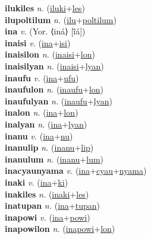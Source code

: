 \textbf{ilukiles} \textit{n.} (\hyperref[iluki]{iluki}+\hyperref[les]{les})
 \label{ilukiles} \\
\textbf{ilupoltilum} \textit{n.} (\hyperref[ilu]{ilu}+\hyperref[poltilum]{poltilum})
 \label{ilupoltilum} \\
\textbf{ina} \textit{v.} (Yor. ⟨iná⟩ [ĩ̄á])
 \label{ina} \\
\textbf{inaisi} \textit{v.} (\hyperref[ina]{ina}+\hyperref[isi]{isi})
 \label{inaisi} \\
\textbf{inaisilon} \textit{n.} (\hyperref[inaisi]{inaisi}+\hyperref[lon]{lon})
 \label{inaisilon} \\
\textbf{inaisilyan} \textit{n.} (\hyperref[inaisi]{inaisi}+\hyperref[lyan]{lyan})
 \label{inaisilyan} \\
\textbf{inaufu} \textit{v.} (\hyperref[ina]{ina}+\hyperref[ufu]{ufu})
 \label{inaufu} \\
\textbf{inaufulon} \textit{n.} (\hyperref[inaufu]{inaufu}+\hyperref[lon]{lon})
 \label{inaufulon} \\
\textbf{inaufulyan} \textit{n.} (\hyperref[inaufu]{inaufu}+\hyperref[lyan]{lyan})
 \label{inaufulyan} \\
\textbf{inalon} \textit{n.} (\hyperref[ina]{ina}+\hyperref[lon]{lon})
 \label{inalon} \\
\textbf{inalyan} \textit{n.} (\hyperref[ina]{ina}+\hyperref[lyan]{lyan})
 \label{inalyan} \\
\textbf{inanu} \textit{v.} (\hyperref[ina]{ina}+\hyperref[nu]{nu})
 \label{inanu} \\
\textbf{inanulip} \textit{n.} (\hyperref[inanu]{inanu}+\hyperref[lip]{lip})
 \label{inanulip} \\
\textbf{inanulum} \textit{n.} (\hyperref[inanu]{inanu}+\hyperref[lum]{lum})
 \label{inanulum} \\
\textbf{inacyaunyama} \textit{v.} (\hyperref[ina]{ina}+\hyperref[cyau]{cyau}+\hyperref[nyama]{nyama})
 \label{inacyaunyama} \\
\textbf{inaki} \textit{v.} (\hyperref[ina]{ina}+\hyperref[ki]{ki})
 \label{inaki} \\
\textbf{inakiles} \textit{n.} (\hyperref[inaki]{inaki}+\hyperref[les]{les})
 \label{inakiles} \\
\textbf{inatupan} \textit{n.} (\hyperref[ina]{ina}+\hyperref[tupan]{tupan})
 \label{inatupan} \\
\textbf{inapowi} \textit{v.} (\hyperref[ina]{ina}+\hyperref[powi]{powi})
 \label{inapowi} \\
\textbf{inapowilon} \textit{n.} (\hyperref[inapowi]{inapowi}+\hyperref[lon]{lon})

